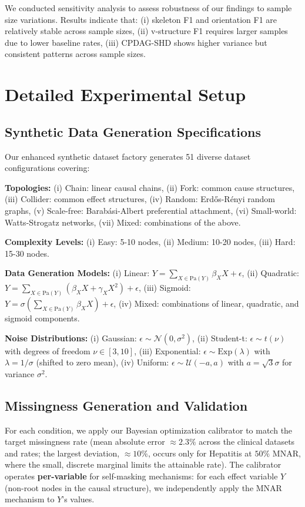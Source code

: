 \documentclass[runningheads]{llncs}
\begin{document}
We conducted sensitivity analysis to assess robustness of our findings to sample size variations. Results indicate that: (i) skeleton F1 and orientation F1 are relatively stable across sample sizes, (ii) v-structure F1 requires larger samples due to lower baseline rates, (iii) CPDAG-SHD shows higher variance but consistent patterns across sample sizes.

\section{Detailed Experimental Setup}

\subsection{Synthetic Data Generation Specifications}

Our enhanced synthetic dataset factory generates 51 diverse dataset configurations covering:

\textbf{Topologies:} (i) Chain: linear causal chains, (ii) Fork: common cause structures, (iii) Collider: common effect structures, (iv) Random: Erdős-Rényi random graphs, (v) Scale-free: Barabási-Albert preferential attachment, (vi) Small-world: Watts-Strogatz networks, (vii) Mixed: combinations of the above.

\textbf{Complexity Levels:} (i) Easy: 5-10 nodes, (ii) Medium: 10-20 nodes, (iii) Hard: 15-30 nodes.

\textbf{Data Generation Models:} (i) Linear: $Y = \sum_{X \in \text{Pa}(Y)} \beta_X X + \epsilon$, (ii) Quadratic: $Y = \sum_{X \in \text{Pa}(Y)} (\beta_X X + \gamma_X X^2) + \epsilon$, (iii) Sigmoid: $Y = \sigma(\sum_{X \in \text{Pa}(Y)} \beta_X X) + \epsilon$, (iv) Mixed: combinations of linear, quadratic, and sigmoid components.

\textbf{Noise Distributions:} (i) Gaussian: $\epsilon \sim \mathcal{N}(0, \sigma^2)$, (ii) Student-t: $\epsilon \sim t(\nu)$ with degrees of freedom $\nu \in [3, 10]$, (iii) Exponential: $\epsilon \sim \text{Exp}(\lambda)$ with $\lambda = 1/\sigma$ (shifted to zero mean), (iv) Uniform: $\epsilon \sim \mathcal{U}(-a, a)$ with $a = \sqrt{3}\sigma$ for variance $\sigma^2$.

\subsection{Missingness Generation and Validation}

For each condition, we apply our Bayesian optimization calibrator to match the target missingness rate (mean absolute error $\approx2.3\%$ across the clinical datasets and rates; the largest deviation, $\approx10\%$, occurs only for Hepatitis at $50\%$ MNAR, where the small, discrete marginal limits the attainable rate). The calibrator operates \textbf{per-variable} for self-masking mechanisms: for each effect variable $Y$ (non-root nodes in the causal structure), we independently apply the MNAR mechanism to $Y$'s values.
\end{document}
